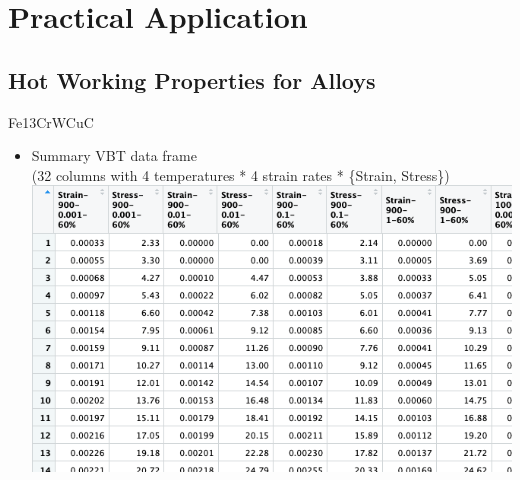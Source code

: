 \documentclass[11pt]{beamer}
\begin{document}
\section{Practical Application}
\subsection{Hot Working Properties for Alloys}
\begin{frame}[t]{Fe{\color{red}13Cr}WCuC}
	\begin{minipage}[t]{1\textwidth}
        \vspace{0pt}
        \begin{itemize}
            \item {\small Summary VBT data frame\\{\scriptsize\color{olive}(32 columns with 4 temperatures * 4 strain rates * \{Strain, Stress\})}}\\
            \singlespacing
            \includegraphics[scale=0.37]{Fig4.png}
        \end{itemize}
    \end{minipage}%
\end{frame}
\end{document}
